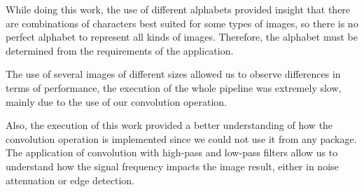 \documentclass[]{IEEEtran}
\begin{document}
While doing this work, the use of different alphabets provided insight that there are combinations of characters best suited for some types of images, so there is no perfect alphabet to represent all kinds of images. Therefore, the alphabet must be determined from the requirements of the application.

The use of several images of different sizes allowed us to observe differences in terms of performance, the execution of the whole pipeline was extremely slow, mainly due to the use of our convolution operation.
 
Also, the execution of this work provided a better understanding of how the convolution operation is implemented since we could not use it from any package. The application of convolution with high-pass and low-pass filters allow us to understand how the signal frequency impacts the image result, either in noise attenuation or edge detection.

  
\end{document}
